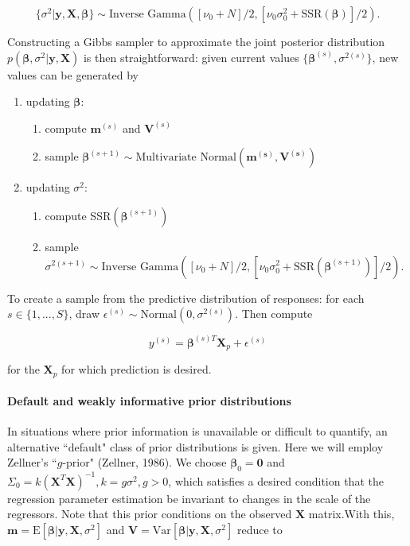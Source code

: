 \documentclass[12pt, a4paper]{article}
\begin{document}
$$\{\sigma^2|\mathbf{y,X},\boldsymbol\beta\} \sim \text{Inverse Gamma}([\nu_0 + N]/2,[\nu_0\sigma^2_0 + \text{SSR}(\boldsymbol\beta)]/2).$$

\vspace{5mm}

\noindent Constructing a Gibbs sampler to approximate the joint posterior distribution $p(\boldsymbol\beta,\sigma^2|\mathbf{y,X})$ is then straightforward:  given current values $\{\boldsymbol\beta^{(s)},\sigma^{2(s)}\}$, new values can be generated by

\begin{enumerate}
    \item updating $\boldsymbol\beta$:
    \begin{enumerate}
        \item compute $\mathbf{m}^{(s)}$ and $\mathbf{V}^{(s)}$
        \item sample $\boldsymbol\beta^{(s+1)} \sim \text{Multivariate Normal}(\mathbf{m^{(s)},V^{(s)}})$
    \end{enumerate}
    \item updating $\sigma^2$:
    \begin{enumerate}
        \item compute SSR$(\boldsymbol\beta^{(s+1)})$
        \item sample $\sigma^{2(s+1)} \sim \text{Inverse Gamma}([\nu_0 + N]/2,[\nu_0\sigma_0^2 + \text{SSR}(\boldsymbol\beta^{(s+1)})]/2)$.
    \end{enumerate}
\end{enumerate}

\noindent To create a sample from the predictive distribution of responses:  for each $s\in\{1,...,S\}$, draw $\epsilon^{(s)} \sim \text{Normal}(0,\sigma^{2(s)})$.  Then compute

$$y^{(s)} = \boldsymbol\beta^{(s)T}\mathbf{X}_p + \epsilon^{(s)}$$

\noindent for the $\mathbf{X}_p$ for which prediction is desired.

    \paragraph{Default and weakly informative prior distributions}

    In situations where prior information is unavailable or difficult to quantify, an alternative ``default" class of prior distributions is given. Here we will employ Zellner's ``$g$-prior" (Zellner, 1986).  We choose $\boldsymbol\beta_0 = \mathbf{0}$ and $\Sigma_0 = k(\mathbf{X}^T\mathbf{X})^{-1}, k = g\sigma^2, g > 0$, which satisfies a desired condition that the regression parameter estimation be invariant to changes in the scale of the regressors.  Note that this prior conditions on the observed $\mathbf{X}$ matrix.With this, $\mathbf{m}=\text{E}[\boldsymbol\beta|\mathbf{y,X},\sigma^2]$ and $\mathbf{V}=\text{Var}[\boldsymbol\beta|\mathbf{y,X},\sigma^2]$ reduce to
\end{document}
